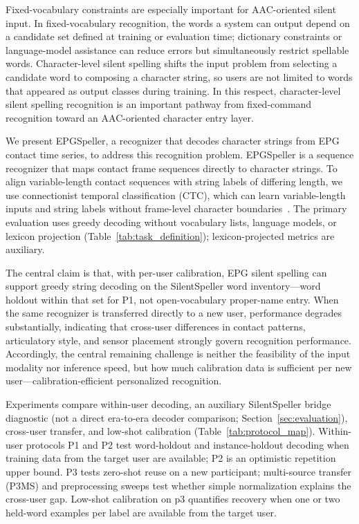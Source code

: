 Fixed-vocabulary constraints are especially important for AAC-oriented silent input.
In fixed-vocabulary recognition, the words a system can output depend on a candidate set defined at training or evaluation time; dictionary constraints or language-model assistance can reduce errors but simultaneously restrict spellable words.
Character-level silent spelling shifts the input problem from selecting a candidate word to composing a character string, so users are not limited to words that appeared as output classes during training.
In this respect, character-level silent spelling recognition is an important pathway from fixed-command recognition toward an AAC-oriented character entry layer.

We present EPGSpeller, a recognizer that decodes character strings from EPG contact time series, to address this recognition problem.
EPGSpeller is a sequence recognizer that maps contact frame sequences directly to character strings.
To align variable-length contact sequences with string labels of differing length, we use connectionist temporal classification (CTC), which can learn variable-length inputs and string labels without frame-level character boundaries~\cite{graves2006connectionist}.
The primary evaluation uses greedy decoding without vocabulary lists, language models, or lexicon projection (Table~\ref{tab:task_definition}); lexicon-projected metrics are auxiliary.

The central claim is that, with per-user calibration, EPG silent spelling can support greedy string decoding on the SilentSpeller word inventory---word holdout within that set for P1, not open-vocabulary proper-name entry.
When the same recognizer is transferred directly to a new user, performance degrades substantially, indicating that cross-user differences in contact patterns, articulatory style, and sensor placement strongly govern recognition performance.
Accordingly, the central remaining challenge is neither the feasibility of the input modality nor inference speed, but how much calibration data is sufficient per new user---calibration-efficient personalized recognition.

Experiments compare within-user decoding, an auxiliary SilentSpeller bridge diagnostic (not a direct era-to-era decoder comparison; Section~\ref{sec:evaluation}), cross-user transfer, and low-shot calibration (Table~\ref{tab:protocol_map}).
Within-user protocols P1 and P2 test word-holdout and instance-holdout decoding when training data from the target user are available; P2 is an optimistic repetition upper bound.
P3 tests zero-shot reuse on a new participant; multi-source transfer (P3MS) and preprocessing sweeps test whether simple normalization explains the cross-user gap.
Low-shot calibration on p3 quantifies recovery when one or two held-word examples per label are available from the target user.

